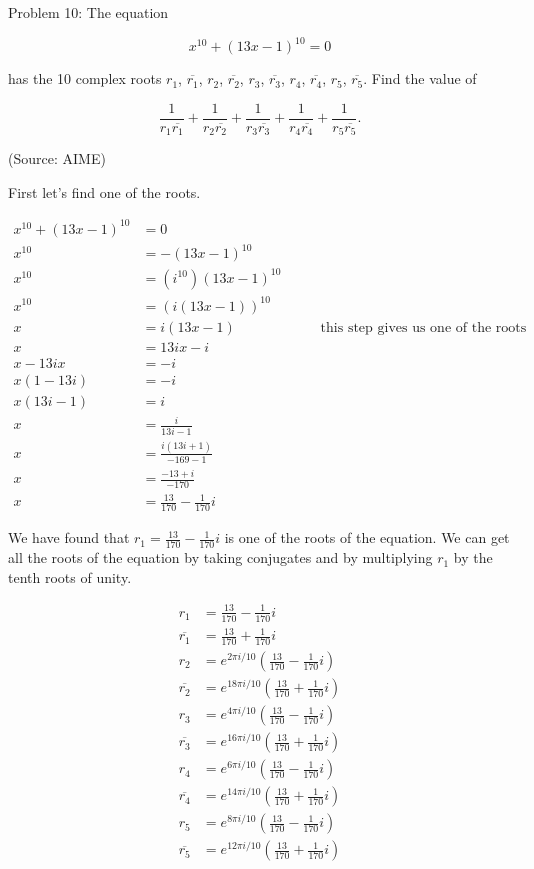Problem 10: The equation

\[x^{10} + (13x - 1)^{10} = 0\] 

has the 10 complex roots $r_1$, $\overline{r_1}$, $r_2$, $\overline{r_2}$, $r_3$, $\overline{r_3}$, $r_4$, $\overline{r_4}$, $r_5$, $\overline{r_5}$. Find the value of 

\[\frac{1}{r_1 \overline{r_1}} + \frac{1}{r_2 \overline{r_2}} + \frac{1}{r_3 \overline{r_3}} + \frac{1}{r_4 \overline{r_4}} + \frac{1}{r_5 \overline{r_5}}.\]

(Source: AIME)

First let's find one of the roots.

\begin{align*}
x^{10} + (13x - 1)^{10} &= 0 \\
x^{10} &= -(13x - 1)^{10} \\
x^{10} &= (i^{10})(13x - 1)^{10} \\
x^{10} &= (i(13x - 1))^{10} \\
x &= i(13x - 1) &\qquad \text{this step gives us one of the roots} \\
x &= 13ix - i \\
x - 13ix &= - i \\
x(1 - 13i) &= - i \\
x(13i - 1) &= i \\
x &= \frac{i}{13i - 1} \\
x &= \frac{i(13i + 1)}{-169 - 1} \\
x &= \frac{-13 + i}{-170} \\
x &= \frac{13}{170} - \frac{1}{170}i
\end{align*}

We have found that $\displaystyle r_1 = \frac{13}{170} - \frac{1}{170}i$ is one of the roots of the equation. We can get all the roots of the equation by taking conjugates and by multiplying $r_1$ by the tenth roots of unity.

\begin{align*}
r_1 &= \frac{13}{170} - \frac{1}{170}i \\
\overline{r_1} &= \frac{13}{170} + \frac{1}{170}i \\
r_2 &= e^{2\pi i / 10}\left(\frac{13}{170} - \frac{1}{170}i\right) \\
\overline{r_2} &= e^{18\pi i / 10}\left(\frac{13}{170} + \frac{1}{170}i\right) \\
r_3 &= e^{4\pi i / 10}\left(\frac{13}{170} - \frac{1}{170}i\right) \\
\overline{r_3} &= e^{16\pi i / 10}\left(\frac{13}{170} + \frac{1}{170}i\right) \\
r_4 &= e^{6\pi i / 10}\left(\frac{13}{170} - \frac{1}{170}i\right) \\
\overline{r_4} &= e^{14\pi i / 10}\left(\frac{13}{170} + \frac{1}{170}i\right) \\
r_5 &= e^{8\pi i / 10}\left(\frac{13}{170} - \frac{1}{170}i\right) \\
\overline{r_5} &= e^{12\pi i / 10}\left(\frac{13}{170} + \frac{1}{170}i\right) \\
\end{align*}

